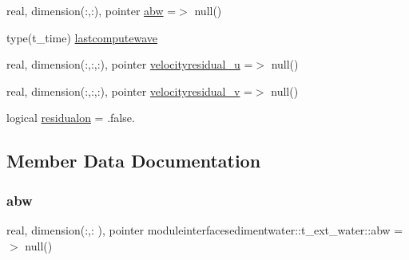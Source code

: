 \begin{DoxyCompactItemize}
\item 
real, dimension(\+:,\+:), pointer \mbox{\hyperlink{structmoduleinterfacesedimentwater_1_1t__ext__water_a77871dd294698828c138d178b4c6f799}{abw}} =$>$ null()
\item 
type(t\+\_\+time) \mbox{\hyperlink{structmoduleinterfacesedimentwater_1_1t__ext__water_a91c57ec4e0ab99c737ccbcaee9aef97b}{lastcomputewave}}
\item 
real, dimension(\+:,\+:,\+:), pointer \mbox{\hyperlink{structmoduleinterfacesedimentwater_1_1t__ext__water_a236b5f058dd56227c6e2d04c16fdf218}{velocityresidual\+\_\+u}} =$>$ null()
\item 
real, dimension(\+:,\+:,\+:), pointer \mbox{\hyperlink{structmoduleinterfacesedimentwater_1_1t__ext__water_a1b77a9313bffe55e13973c6d5c1b402c}{velocityresidual\+\_\+v}} =$>$ null()
\item 
logical \mbox{\hyperlink{structmoduleinterfacesedimentwater_1_1t__ext__water_a0fe3391944dc4167426f9e56b5064c09}{residualon}} = .false.
\end{DoxyCompactItemize}


\subsection{Member Data Documentation}
\mbox{\label{structmoduleinterfacesedimentwater_1_1t__ext__water_a77871dd294698828c138d178b4c6f799}} 
\subsubsection{\texorpdfstring{abw}{abw}}
{\footnotesize\ttfamily real, dimension(\+:,\+:  ), pointer moduleinterfacesedimentwater\+::t\+\_\+ext\+\_\+water\+::abw =$>$ null()\hspace{0.3cm}{\ttfamily [private]}}

\mbox{\label{structmoduleinterfacesedimentwater_1_1t__ext__water_a27b54d1dd988ad4bdafb746eee6df366}} 
